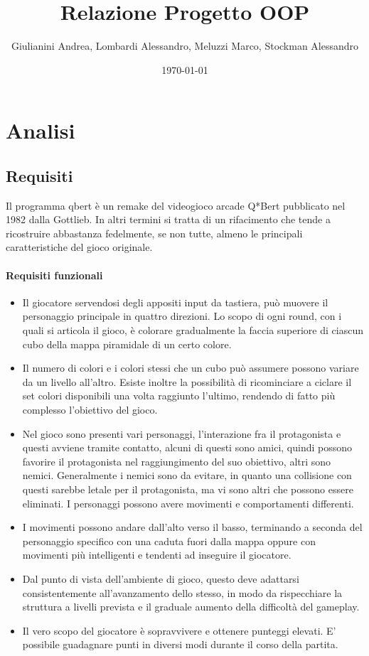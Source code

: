 \documentclass[a4paper,12pt, hidelinks]{report}
\title{\Huge \textbf{Relazione Progetto OOP}}
\author{Giulianini Andrea, Lombardi Alessandro, Meluzzi Marco, Stockman Alessandro}
\date{\today}
\begin{document}
\maketitle
\justify

\tableofcontents

\chapter{Analisi}

\section{Requisiti}

Il programma qbert è un remake del videogioco arcade Q*Bert pubblicato nel 1982 dalla Gottlieb. In altri termini si tratta di un rifacimento che  tende a ricostruire abbastanza  fedelmente, se non tutte, almeno le principali caratteristiche del gioco originale.

\subsubsection{Requisiti funzionali}
\begin{itemize}
	\item Il giocatore servendosi degli appositi input da tastiera, può muovere il personaggio principale in quattro direzioni. Lo scopo di ogni round, con i quali si articola il gioco, è colorare gradualmente la faccia superiore di ciascun cubo della mappa piramidale di un certo colore.
	\item Il numero di colori e i colori stessi che un cubo può assumere possono variare da un livello all'altro. Esiste inoltre la possibilità di ricominciare a ciclare il set colori disponibili una volta raggiunto l'ultimo, rendendo di fatto più complesso l'obiettivo del gioco.
	\item Nel gioco sono presenti vari personaggi, l'interazione fra il protagonista e questi avviene tramite contatto, alcuni di questi sono amici, quindi possono favorire il protagonista nel raggiungimento del suo obiettivo, altri sono nemici. Generalmente i nemici sono da evitare, in quanto una collisione con questi sarebbe letale per il protagonista, ma vi sono altri che possono essere eliminati. I personaggi possono avere movimenti e comportamenti differenti.
	\item I movimenti possono andare dall'alto verso il basso, terminando a seconda del personaggio specifico con una caduta fuori dalla mappa oppure con movimenti più intelligenti e tendenti ad inseguire il giocatore.
	\item Dal punto di vista dell’ambiente di gioco, questo deve adattarsi consistentemente all’avanzamento dello stesso, in modo da rispecchiare la struttura a livelli prevista e il graduale aumento della difficoltà del gameplay.
	\item Il vero scopo del giocatore è sopravvivere e ottenere punteggi elevati. E' possibile guadagnare punti in diversi modi durante il corso della partita.
\end{itemize}
\end{document}
